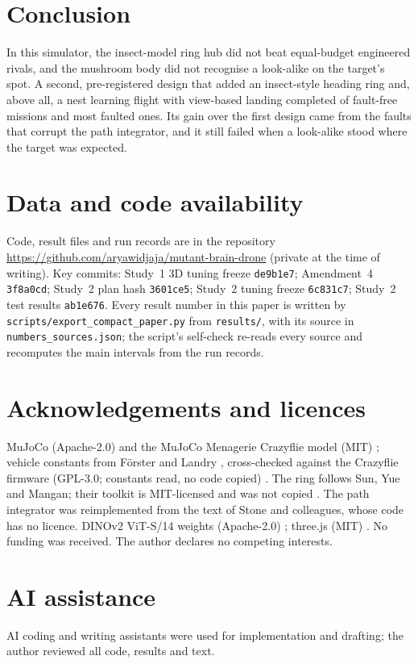 \documentclass[10pt,twocolumn]{article}
\begin{document}
\section{Conclusion}
In this simulator, the insect-model ring hub did not beat equal-budget engineered rivals, and the mushroom body did not recognise a look-alike on the target's spot. A second, pre-registered design that added an insect-style heading ring and, above all, a nest learning flight with view-based landing completed \StwoNoFault{} of fault-free missions and most faulted ones. Its gain over the first design came from the faults that corrupt the path integrator, and it still failed when a look-alike stood where the target was expected.

\section*{Data and code availability}
Code, result files and run records are in the repository \url{https://github.com/aryawidjaja/mutant-brain-drone} (private at the time of writing). Key commits: Study~1 3D tuning freeze \texttt{de9b1e7}; Amendment~4 \texttt{3f8a0cd}; Study~2 plan hash \texttt{3601ce5}; Study~2 tuning freeze \texttt{6c831c7}; Study~2 test results \texttt{ab1e676}. Every result number in this paper is written by \texttt{scripts/export\_compact\_paper.py} from \texttt{results/}, with its source in \texttt{numbers\_sources.json}; the script's self-check re-reads every source and recomputes the main intervals from the run records.

\section*{Acknowledgements and licences}
MuJoCo (Apache-2.0) and the MuJoCo Menagerie Crazyflie model (MIT) \citep{mujoco2012,menagerie2022}; vehicle constants from Förster \citep{forster2015} and Landry \citep{landry2015}, cross-checked against the Crazyflie firmware (GPL-3.0; constants read, no code copied) \citep{cffirmware}. The ring follows Sun, Yue and Mangan; their toolkit is MIT-licensed and was not copied \citep{suntoolkit2024}. The path integrator was reimplemented from the text of Stone and colleagues, whose code has no licence. DINOv2 ViT-S/14 weights (Apache-2.0) \citep{dinov22023}; three.js (MIT) \citep{threejs2026}. No funding was received. The author declares no competing interests.

\section*{AI assistance}
AI coding and writing assistants were used for implementation and drafting; the author reviewed all code, results and text.

\small\raggedright


\end{document}
